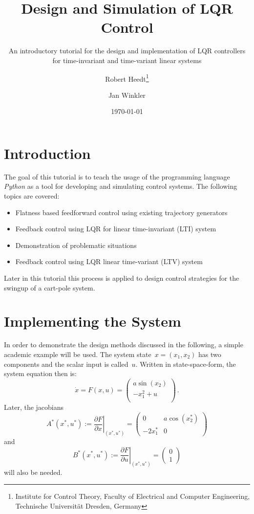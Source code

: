 \documentclass[a4paper,11pt,headinclude=true,headsepline,parskip=half,DIV=13]{scrartcl}
\title{Design and Simulation of LQR Control}
\subtitle{An introductory tutorial for the design and implementation of LQR controllers for time-invariant and time-variant linear systems}
\author{Robert Heedt\thanks{Institute for Control Theory, Faculty of Electrical and Computer Engineering, Technische Universität Dresden, Germany} \and Jan Winkler\footnotemark[1]}
\date{\today}
\newcommand{\py}{\emph{Python}\xspace}
\begin{document}
\maketitle




\tableofcontents

\newpage

\section{Introduction}
The goal of this tutorial is to teach the usage of the programming language \py as a tool for developing and simulating control systems.
The following topics are covered:
\begin{itemize}
    \item Flatness based feedforward control using existing trajectory generators
    \item Feedback control using LQR for linear time-invariant (LTI) system
    \item Demonstration of problematic situations
    \item Feedback control using LQR linear time-variant (LTV) system
\end{itemize}
Later in this tutorial this process is applied to design control strategies for the swingup of a cart-pole system.

\section{Implementing the System}
In order to demonstrate the design methods discussed in the following, a simple academic example\autocite{ludyk} will be used.
The system state~$x=(x_1, x_2)$ has two components and the scalar input is called~$u$.
Written in state-space-form, the system equation then is:
\begin{equation}
\dot x = F(x, u) = 
\begin{pmatrix}
a \sin(x_2)\\
-x_1^2+u\\
\end{pmatrix}\,.
\label{eq:academic_example_ss}
\end{equation}
Later, the jacobians
\begin{equation}
A^*(x^*, u^*) := \left.\frac{\partial F}{\partial x}\right\vert_{(x^*, u^*)}= \begin{pmatrix}0 & a \cos(x^*_2)\\-2 x^*_1 & 0\end{pmatrix}
\label{eq:jac_A}
\end{equation}
and
\begin{equation}
B^*(x^*, u^*) := \left.\frac{\partial F}{\partial u}\right\vert_{(x^*, u^*)}= \begin{pmatrix}0 \\ 1\end{pmatrix}
\label{eq:jac_B}
\end{equation}
will also be needed.
\end{document}

